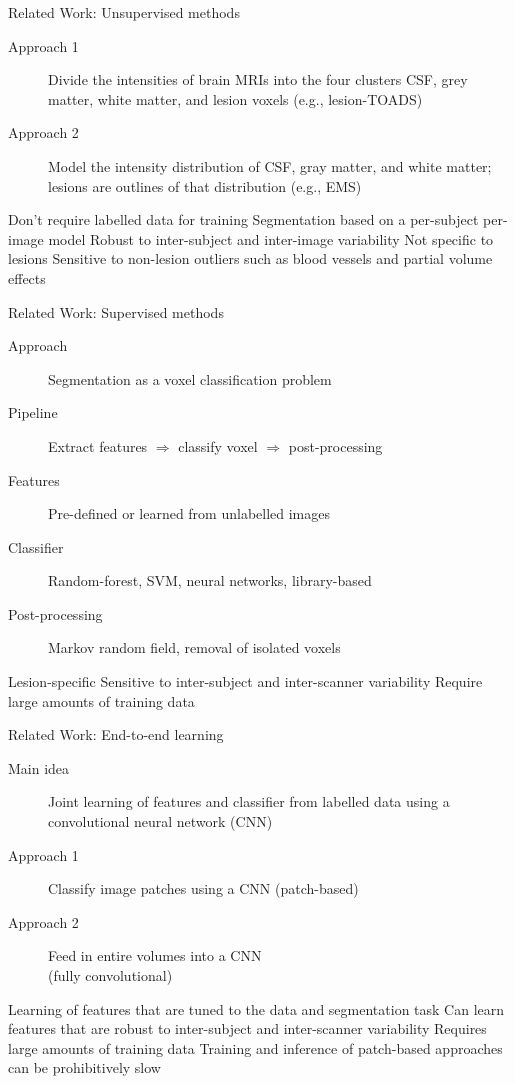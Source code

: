 \documentclass{beamer}
\begin{document}
\begin{frame}{Related Work: Unsupervised methods}
\begin{description}
\item[Approach 1] 
Divide the intensities of brain MRIs into the four clusters
CSF, grey matter, white matter, and lesion voxels (e.g., lesion-TOADS)
\item[Approach 2] Model the intensity distribution of CSF, gray matter, and
white matter; lesions are outlines of that distribution (e.g., EMS)
\end{description}
\begin{itemize}
 Don't require labelled data for training
 Segmentation based on a per-subject per-image model
 Robust to inter-subject and inter-image variability
 Not specific to lesions
 Sensitive to non-lesion outliers such as blood vessels and partial
volume effects
\end{itemize}
\end{frame}

\begin{frame}{Related Work: Supervised methods}
\begin{description}
\item[Approach] Segmentation as a voxel classification problem
\item[Pipeline] Extract features $\Rightarrow$ classify voxel $\Rightarrow$
post-processing
\item[Features] Pre-defined or learned from unlabelled images
\item[Classifier] Random-forest, SVM, neural networks, library-based
\item[Post-processing] Markov random field, removal of isolated voxels
\end{description}
\begin{itemize}
 Lesion-specific
 Sensitive to inter-subject and inter-scanner variability
 Require large amounts of training data
\end{itemize}
\end{frame}

\begin{frame}{Related Work: End-to-end learning}
\begin{description}
\item[Main idea] Joint learning of features and classifier from labelled data
using a convolutional neural network (CNN)
\item[Approach 1] Classify image patches using a CNN (patch-based)
\item[Approach 2] Feed in entire volumes into a CNN\\ (fully convolutional)
\end{description}
\begin{itemize}
 Learning of features that are tuned to the data and segmentation
task
 Can learn features that are robust to inter-subject and inter-scanner
variability
 Requires large amounts of training data
 Training and inference of patch-based approaches can be prohibitively
slow
\end{itemize}
\end{frame}
\end{document}
